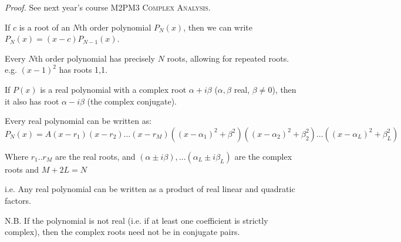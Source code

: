\documentclass[twoside]{scrartcl}
\begin{document}
\textit{Proof.} See next year's course \textsc{M2PM3 Complex Analysis.}\\


\begin{corollary}
If $c$ is a root of an $N$th order polynomial $P_N(x)$, then we can write $P_N(x) = (x-c)P_{N-1}(x)$.
\end{corollary}\vspace*{5pt}

\begin{corollary}
Every $N$th order polynomial has precisely $N$ roots, allowing for repeated roots. e.g. $(x-1)^2$ has roots 1,1.
\end{corollary}\vspace*{5pt}

\begin{corollary}
If $P(x)$ is a real polynomial with a complex root $\alpha + i\beta$ ($\alpha, \beta$ real, $\beta \neq 0$), then it also has root $\alpha - i\beta$ (the complex conjugate).
\end{corollary}\vspace*{5pt}

\begin{corollary}
Every real polynomial can be written as:\\ $P_N(x) = A(x-r_1)(x-r_2)...(x-r_M)((x-\alpha _1)^2 + \beta ^2)((x-\alpha _2)^2 + \beta _2^2)...((x - \alpha _ L)^2 + \beta _L^2)$

Where $r_1.. r_M$ are the real roots, and $(\alpha \pm i \beta),... (\alpha _L \pm i\beta _L)$ are the complex roots and $M + 2L = N$
\end{corollary}

i.e. Any real polynomial can be written as a product of real linear and quadratic factors.

N.B. If the polynomial is not real (i.e. if at least one coefficient is strictly complex), then the complex roots need not be in conjugate pairs.\\
\end{document}
